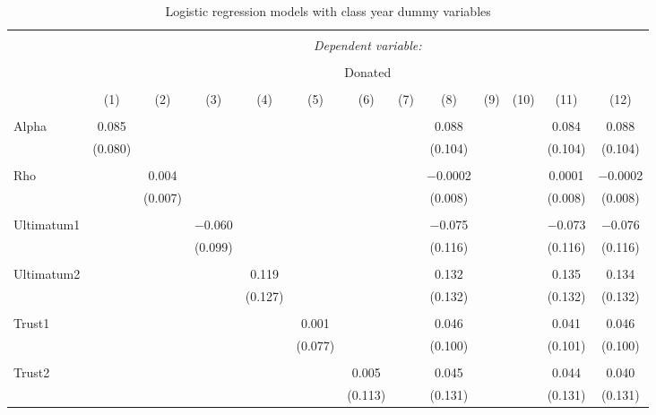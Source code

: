 \begin{subtables}
\begin{table}[H] \centering 
  \caption{Logistic regression models with class year dummy variables} 
  \label{} 
  \begin{adjustbox}{width=\textwidth}
  \begin{tabular}{@{\extracolsep{5pt}}lcccccccccccc} 
\\[-1.8ex]\hline 
\hline \\[-1.8ex] 
 & \multicolumn{12}{c}{\textit{Dependent variable:}} \\ 
\cline{2-13} 
\\[-1.8ex] & \multicolumn{12}{c}{Donated} \\ 
\\[-1.8ex] & (1) & (2) & (3) & (4) & (5) & (6) & (7) & (8) & (9) & (10) & (11) & (12)\\ 
\hline \\[-1.8ex] 
 Alpha & 0.085 &  &  &  &  &  &  & 0.088 &  &  & 0.084 & 0.088 \\ 
  & (0.080) &  &  &  &  &  &  & (0.104) &  &  & (0.104) & (0.104) \\ 
  & & & & & & & & & & & & \\ 
 Rho &  & 0.004 &  &  &  &  &  & $-$0.0002 &  &  & 0.0001 & $-$0.0002 \\ 
  &  & (0.007) &  &  &  &  &  & (0.008) &  &  & (0.008) & (0.008) \\ 
  & & & & & & & & & & & & \\ 
 Ultimatum1 &  &  & $-$0.060 &  &  &  &  & $-$0.075 &  &  & $-$0.073 & $-$0.076 \\ 
  &  &  & (0.099) &  &  &  &  & (0.116) &  &  & (0.116) & (0.116) \\ 
  & & & & & & & & & & & & \\ 
 Ultimatum2 &  &  &  & 0.119 &  &  &  & 0.132 &  &  & 0.135 & 0.134 \\ 
  &  &  &  & (0.127) &  &  &  & (0.132) &  &  & (0.132) & (0.132) \\ 
  & & & & & & & & & & & & \\ 
 Trust1 &  &  &  &  & 0.001 &  &  & 0.046 &  &  & 0.041 & 0.046 \\ 
  &  &  &  &  & (0.077) &  &  & (0.100) &  &  & (0.101) & (0.100) \\ 
  & & & & & & & & & & & & \\ 
 Trust2 &  &  &  &  &  & 0.005 &  & 0.045 &  &  & 0.044 & 0.040 \\ 
  &  &  &  &  &  & (0.113) &  & (0.131) &  &  & (0.131) & (0.131) \\ 

\end{tabular}
\end{adjustbox}
\end{table}
\end{subtables}
